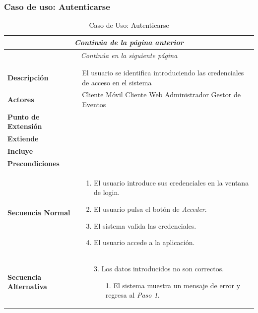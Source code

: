 \subsubsection*{Caso de uso: Autenticarse}
\begin{longtable}{| p{4cm} | p{10cm} |}
\endfirsthead
\multicolumn{2}{c}{\textit{Continúa de la página anterior}}\\[12pt]
\hline
\endhead
\hline
\multicolumn{2}{c}{\textit{Continúa en la siguiente página}} \\
\endfoot
\hline
\caption{Caso de Uso: Autenticarse}\label{fig:1}\\
\endlastfoot


\hline
\multicolumn{2}{|c|}{\textbf{CU$<$01$>$ - Autenticarse}} \\

\hline
\textbf{Descripción} &
El usuario se identifica introduciendo las credenciales de acceso en el sistema \\

\hline
\textbf{Actores} &
Cliente Móvil\newline
Cliente Web\newline
Administrador\newline
Gestor de Eventos\\

\hline
\textbf{Punto de Extensión} &
\\

\hline
\textbf{Extiende} &
\\

\hline
\textbf{Incluye} &
\\

\hline
\textbf{Precondiciones} &
\\

\hline
\textbf{Secuencia Normal} &\mbox{}\par\vspace{-\baselineskip}
\begin{enumerate}[leftmargin=0.7cm, topsep=0.1cm]
\item El usuario introduce sus credenciales en la ventana de login. 
\item El usuario pulsa el botón de \textit{Acceder}.
\item El sistema valida las credenciales.
\item El usuario accede a la aplicación.
\end{enumerate}\\

\hline
\textbf{Secuencia Alternativa} &\mbox{}\par\vspace{-\baselineskip}
\begin{enumerate}[leftmargin=0.9cm, topsep=0.1cm]
\item[3.] Los datos introducidos no son correctos.
	\begin{itemize}
	\item[1.] El sistema muestra un mensaje de error y regresa al \textit{Paso 1}.
	\end{itemize}


\end{enumerate}
\end{longtable}
